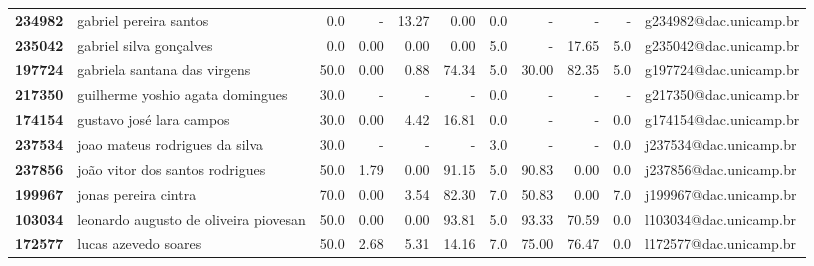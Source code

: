 \documentclass[11pt]{article}
\begin{document}
\begin{center}
\begin{landscape}
\begin{longtable}{llrrrrrrrrl}
\textbf{234982} &                 gabriel pereira santos &                   0.0 &           - &       13.27 &        0.00 &                      0.0 &           - &           - &                          - &  g234982@dac.unicamp.br \\
\textbf{235042} &                gabriel silva gonçalves &                   0.0 &        0.00 &        0.00 &        0.00 &                      5.0 &           - &       17.65 &                        5.0 &  g235042@dac.unicamp.br \\
\textbf{197724} &           gabriela santana das virgens &                  50.0 &        0.00 &        0.88 &       74.34 &                      5.0 &       30.00 &       82.35 &                        5.0 &  g197724@dac.unicamp.br \\
\textbf{217350} &       guilherme yoshio agata domingues &                  30.0 &           - &           - &           - &                      0.0 &           - &           - &                          - &  g217350@dac.unicamp.br \\
\textbf{174154} &               gustavo josé lara campos &                  30.0 &        0.00 &        4.42 &       16.81 &                      0.0 &           - &           - &                        0.0 &  g174154@dac.unicamp.br \\
\textbf{237534} &         joao mateus rodrigues da silva &                  30.0 &           - &           - &           - &                      3.0 &           - &           - &                        0.0 &  j237534@dac.unicamp.br \\
\textbf{237856} &        joão vitor dos santos rodrigues &                  50.0 &        1.79 &        0.00 &       91.15 &                      5.0 &       90.83 &        0.00 &                        0.0 &  j237856@dac.unicamp.br \\
\textbf{199967} &                   jonas pereira cintra &                  70.0 &        0.00 &        3.54 &       82.30 &                      7.0 &       50.83 &        0.00 &                        7.0 &  j199967@dac.unicamp.br \\
\textbf{103034} &  leonardo augusto de oliveira piovesan &                  50.0 &        0.00 &        0.00 &       93.81 &                      5.0 &       93.33 &       70.59 &                        0.0 &  l103034@dac.unicamp.br \\
\textbf{172577} &                   lucas azevedo soares &                  50.0 &        2.68 &        5.31 &       14.16 &                      7.0 &       75.00 &       76.47 &                        0.0 &  l172577@dac.unicamp.br \\

\end{longtable}
\end{landscape}
\end{center}
\end{document}
